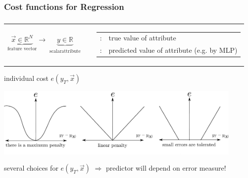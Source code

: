 \subsubsection{Cost functions for Regression}

\begin{frame}\frametitle{\subsecname}


  \begin{tabular}{c c c}
    \parbox{4cm}{
      \[ \underbrace{\vec{x}
          \in \mathbb{R}^N
      }_{\text{feature vector}}
      \longrightarrow 
      \underbrace{y
      \in \mathbb{R}
      }_{\substack{\text{scalar}\\ \text{attribute}}}
      \]}
    & & 
    \parbox{8cm}{\footnotesize
      \begin{tabular}{l l}
	$y_T$: & true value of attribute \\
	$y(\vec{x}; \vec w)$: & predicted value of attribute (e.g. by MLP)
      \end{tabular}
    }
  \end{tabular}
     \pause

  \begin{block}{individual cost $e(y_T, \vec{x})$}
    \begin{center} \includegraphics[width=12cm]{img/section1_fig17_v2.pdf} \end{center}
  \end{block}   %
  {several choices for $e(y_T, \vec{x})$ $\Rightarrow$  predictor will depend on error measure!}

\end{frame}
